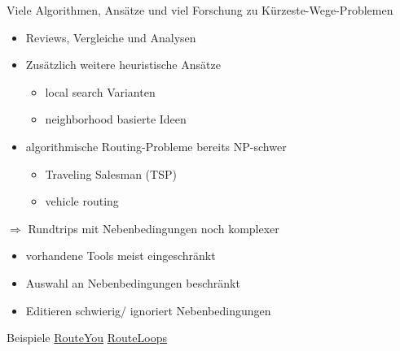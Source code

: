 \documentclass[aspectratio=169,xcolor=dvipsnames, t]{beamer}
\begin{document}
	\begin{frame}
		\vspace{0.5cm}
		Viele Algorithmen, Ansätze und viel  Forschung zu Kürzeste-Wege-Problemen
		\pause
		\begin{itemize}[<+->]
			\item Reviews, Vergleiche und Analysen \cite{madkourSurveyShortestPathAlgorithms2017, sommerShortestpathQueriesStatic2014, wayahdiGreedyAStarDijkstra2021}
			\item Zusätzlich weitere heuristische Ansätze
			\begin{itemize}[<+->]
				\item local search Varianten \cite{braysyVehicleRoutingProblem2005, irnichSequentialSearchIts2006, ropkeHeuristicExactAlgorithms2005}
				\item neighborhood basierte Ideen \cite{braysyVehicleRoutingProblem2005, irnichSequentialSearchIts2006, ropkeHeuristicExactAlgorithms2005}
			\end{itemize} 
		\item algorithmische Routing-Probleme  bereits NP-schwer \cite{reineltTravelingSalesmanComputational2003}
		\begin{itemize}[<+->]
			\item Traveling Salesman (TSP)\cite{gendreauHandbookMetaheuristics2010} 
			\item vehicle routing \cite{braysyVehicleRoutingProblem2005, irnichSequentialSearchIts2006}
		\end{itemize}
		\end{itemize}
		\pause
		
		$\Rightarrow$ Rundtrips mit Nebenbedingungen noch komplexer \cite{gemsaEfficientComputationJogging2013}
		\pause
		\begin{itemize}[<+->]
			\item vorhandene Tools meist eingeschränkt
			\item Auswahl an Nebenbedingungen beschränkt
			\item Editieren schwierig/ ignoriert Nebenbedingungen
		\end{itemize}
	\end{frame}
	
	\begin{frame}{Beispiele}
		\centering
		\vspace{2.5cm}
		\Huge
		\only<1> {\href{https://www.routeyou.com}{RouteYou}}
		\only<2> {\href{https://www.routeloops.com/}{RouteLoops}}
	\end{frame}
	
\end{document}
